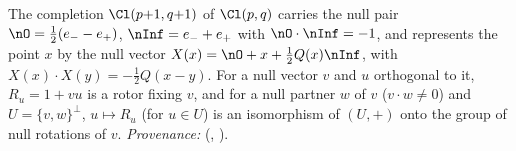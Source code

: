 The completion $\Cl(p{+}1,q{+}1)$ of $\Cl(p,q)$ carries the null pair $\nO = \tfrac12(e_{-} - e_{+})$, $\nInf = e_{-} + e_{+}$ with $\nO \cdot \nInf = -1$, and represents the point $x$ by the null vector $X(x) = \nO + x + \tfrac12 Q(x)\nInf$, with $X(x)\cdot X(y) = -\tfrac12 Q(x - y)$. For a null vector $v$ and $u$ orthogonal to it, $R_{u} = 1 + vu$ is a rotor fixing $v$, and for a null partner $w$ of $v$ ($v \cdot w \neq 0$) and $U = \{v, w\}^{\perp}$, $u \mapsto R_{u}$ (for $u \in U$) is an isomorphism of $(U, +)$ onto the group of null rotations of $v$. \emph{Provenance:} \cite[Sec.~4.3, Lem.~4.6, Thm.~4.10]{ButlerT1} (, ).
